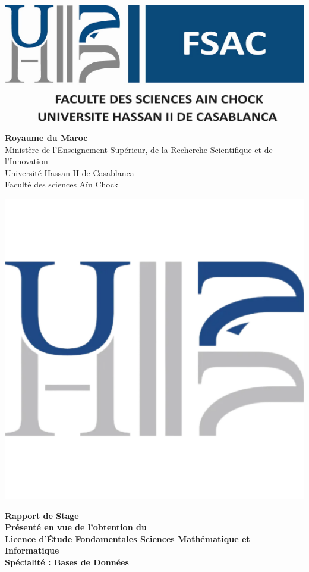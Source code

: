 \begin{minipage}[1]{0.2\columnwidth}
    \includegraphics[width=\columnwidth]{images/fsac.pdf}
\end{minipage}
\hfill
\begin{minipage}[1]{0.4\columnwidth}
    \centering
    \textbf{Royaume du Maroc}\\
    Ministère de l’Enseignement Supérieur, de la Recherche Scientifique et de l'Innovation\\[.25cm]
    Université Hassan II de Casablanca\\
    Faculté des sciences Aïn Chock\\
\end{minipage}
\hfill
\begin{minipage}[1]{0.2\columnwidth}
    \includegraphics[width=.75\columnwidth]{images/univh2.pdf}
\end{minipage}

\begin{center}
  \vspace{2cm}
    {\LARGE{\textbf{Rapport de Stage}}}\\
    \vskip1cm
    \large
    {\textbf{Présenté en vue de l'obtention du}}\\
    \vskip2mm
    {\textbf{Licence d'\'Etude Fondamentales Sciences Mathématique et Informatique}}\\
    {\textbf{Spécialité : Bases de Données}}\\
\end{center}

